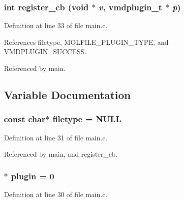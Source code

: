 \subsubsection{\setlength{\rightskip}{0pt plus 5cm}int register\_\-cb (void $\ast$ {\em v}, {\bf vmdplugin\_\-t} $\ast$ {\em p})\hspace{0.3cm}{\tt  [static]}}\label{main_8c_a2}




Definition at line 33 of file main.c.

References filetype, MOLFILE\_\-PLUGIN\_\-TYPE, and VMDPLUGIN\_\-SUCCESS.

Referenced by main.

\subsection{Variable Documentation}
\subsubsection{\setlength{\rightskip}{0pt plus 5cm}const char$\ast$ filetype = NULL\hspace{0.3cm}{\tt  [static]}}\label{main_8c_a1}




Definition at line 31 of file main.c.

Referenced by main, and register\_\-cb.
\subsubsection{$\ast$ plugin = 0\hspace{0.3cm}{\tt  [static]}}\label{main_8c_a0}




Definition at line 30 of file main.c.